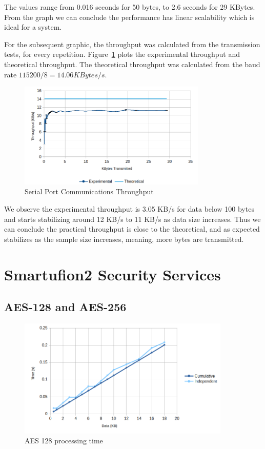 The values range from 0.016 seconds for 50 bytes, to 2.6 seconds for 29 KBytes.
From the graph we can conclude the performance has linear scalability which is ideal for a system.

For the subsequent graphic, the throughput was calculated from the transmission tests, for every repetition.
Figure~\ref{fig:comms:tput} plots the experimental throughput and theoretical throughput. The theoretical throughput was calculated from the baud rate \(115200/8 = 14.06 KBytes/s\).
\begin{figure}[h!]
	\centering
	\includegraphics[width=0.8\textwidth]{./Images/comms-tput.png}
	\caption{Serial Port Communications Throughput}
	\label{fig:comms:tput}
\end{figure}

We observe the experimental throughput is 3.05 KB/s for data below 100 bytes and starts stabilizing around 12 KB/s to 11 KB/s as data size increases.
Thus we can conclude the practical throughput is close to the theoretical, and as expected stabilizes as the sample size increases, meaning, more bytes are transmitted.

\section{Smartufion2 Security Services}\label{chap:evaluation:board}

\subsection{AES-128 and AES-256}\label{chap:evaluation:board:aes}

\begin{figure}[h!]
	\centering
	\includegraphics[width=0.9\textwidth]{./Images/aes128-compare.png}
	\caption{AES 128 processing time}
	\label{fig:performance:aes128:compare}
\end{figure}

